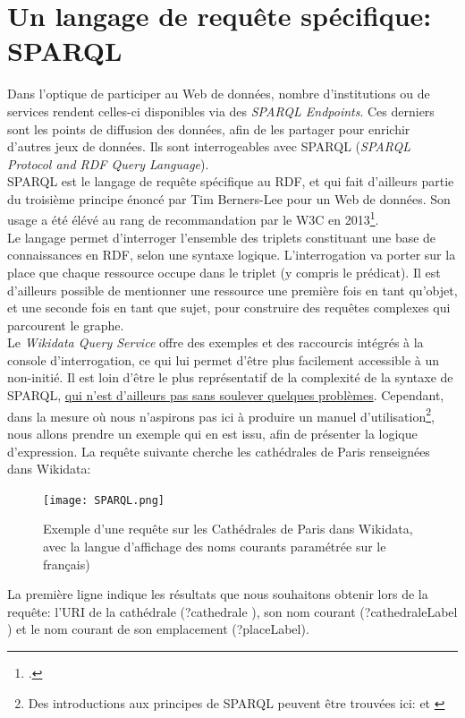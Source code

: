 \documentclass[a4paper,12pt,twoside]{book}
\begin{document}
\section{Un langage de requête spécifique: SPARQL}

Dans l'optique de participer au Web de données, nombre d'institutions ou de services rendent celles-ci disponibles via des \textit{SPARQL Endpoints}. Ces derniers sont les points de diffusion des données, afin de les partager pour enrichir d'autres jeux de données. Ils sont interrogeables avec SPARQL (\textit{SPARQL Protocol and RDF Query Language}).\\

SPARQL est le langage de requête spécifique au RDF, et qui fait d'ailleurs partie du troisième principe énoncé par Tim Berners-Lee pour un Web de données. Son usage a été élévé au rang de recommandation par le W3C en 2013\footnote{\cite{worldwidewebconsortiumSPARQLQueryLanguage2013}.}.\\

Le langage permet d'interroger l'ensemble des triplets constituant une base de connaissances en RDF, selon une syntaxe logique. L'interrogation va porter sur la place que chaque ressource occupe dans le triplet (y compris le prédicat). Il est d'ailleurs possible de mentionner une ressource une première fois en tant qu'objet, et une seconde fois en tant que sujet, pour construire des requêtes complexes qui parcourent le graphe.\\

Le \textit{Wikidata Query Service} offre des exemples et des raccourcis intégrés à la console d'interrogation, ce qui lui permet d'être plus facilement accessible à un non-initié. Il est loin d'être le plus représentatif de la complexité de la syntaxe de SPARQL, \hyperref[obstacle-SPARQL]{qui n'est d'ailleurs pas sans soulever quelques problèmes}. Cependant, dans la mesure où nous n'aspirons pas ici à produire un manuel d'utilisation\footnote{Des introductions aux principes de SPARQL peuvent être trouvées ici: \cite[p.~71-72]{vanhoolandIntroductionAuxHumanites2016} et \cite{maillotApercusRechercheInterroger2014}}, nous allons prendre un exemple qui en est issu, afin de présenter la logique d'expression. La requête suivante cherche les cathédrales de Paris renseignées dans Wikidata: 
\newpage

\begin{figure}[h]
    \centering
    \texttt{[image: SPARQL.png]}
    \caption{Exemple d'une requête sur les Cathédrales de Paris dans Wikidata, avec la langue d'affichage des noms courants paramétrée sur le français)}
    \label{fig:enter-label}
\end{figure}
La première ligne indique les résultats que nous souhaitons obtenir lors de la requête: l'URI de la cathédrale (\og ?cathedrale \fg), son nom courant (\og ?cathedraleLabel \fg) et le nom courant de son emplacement (\og ?placeLabel\fg).
\end{document}

